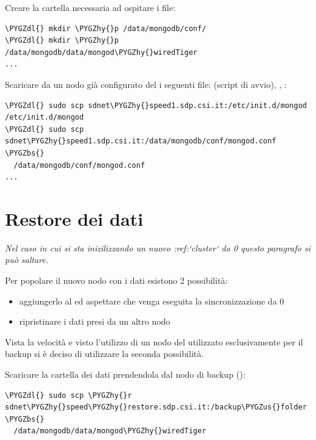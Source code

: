 \documentclass[a4paper,10pt,english]{sphinxmanual}
\def\PYGZbs{\char`\\}
\def\PYGZus{\char`\_}
\def\PYGZdl{\char`\$}
\def\PYGZhy{\char`\-}
\begin{document}
Creare la cartella necessaria ad ospitare i file:

\begin{Verbatim}[commandchars=\\\{\}]
\PYGZdl{} mkdir \PYGZhy{}p /data/mongodb/conf/
\PYGZdl{} mkdir \PYGZhy{}p /data/mongodb/data/mongod\PYGZhy{}wiredTiger
...
\end{Verbatim}

Scaricare da un nodo già configurato del {\hyperref[cluster_architecture/architecture:replica-set]{\emph{}}} i seguenti file:  (script
di avvio), , :

\begin{Verbatim}[commandchars=\\\{\}]
\PYGZdl{} sudo scp sdnet\PYGZhy{}speed1.sdp.csi.it:/etc/init.d/mongod /etc/init.d/mongod
\PYGZdl{} sudo scp sdnet\PYGZhy{}speed1.sdp.csi.it:/data/mongodb/conf/mongod.conf \PYGZbs{}
  /data/mongodb/conf/mongod.conf
...
\end{Verbatim}


\section{Restore dei dati}
\label{cluster_architecture/add_replica:restore-dei-dati}
\emph{Nel caso in cui si sta inizilizzando un nuovo :ref:{}`cluster{}` da 0 questo paragrafo si può
saltare.}

Per popolare il nuovo nodo con i dati esistono 2 possibilità:
\begin{itemize}
\item {} 
aggiungerlo al {\hyperref[cluster_architecture/architecture:replica-set]{\emph{}}} ed aspettare che venga eseguita la sincronizzazione da 0

\item {} 
ripristinare i dati presi da un altro nodo

\end{itemize}

Vista la velocità e visto l'utilizzo di un nodo del {\hyperref[cluster_architecture/architecture:replica-set]{\emph{}}} utilizzato esclusivamente
per il backup si è deciso di utilizzare la seconda possibilità.

Scaricare la cartella dei dati prendendola dal nodo di backup ():

\begin{Verbatim}[commandchars=\\\{\}]
\PYGZdl{} sudo scp \PYGZhy{}r sdnet\PYGZhy{}speed\PYGZhy{}restore.sdp.csi.it:/backup\PYGZus{}folder \PYGZbs{}
  /data/mongodb/data/mongod\PYGZhy{}wiredTiger
\end{Verbatim}
\end{document}
